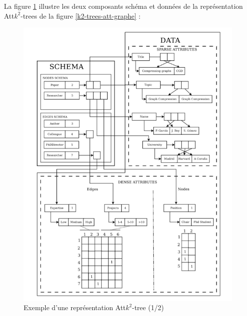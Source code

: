 \begin{itemize}
\begin{description}
\end{description}
La figure \ref{k2-trees-att-schema} illustre les deux composants schéma et données de la représentation Att$k^2$-trees  de la figure \ref{k2-trees-att-graphe} \citep{alvarez2018compact}:
\begin{figure}[H]
\begin{center}
\includegraphics[scale=0.7]{./ressources/image/k2-trees-att-schema.png} 
\end{center}
\caption{Exemple d'une représentation Att$k^2$-tree (1/2)}
\label{k2-trees-att-schema}
\end{figure}



\end{itemize}
